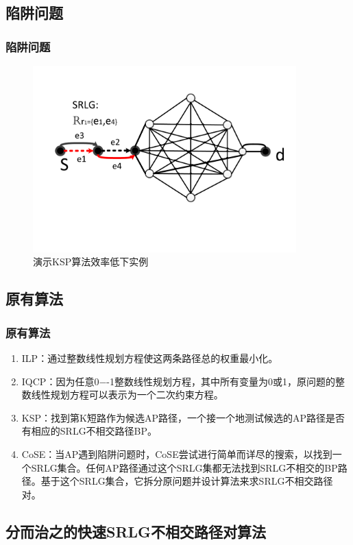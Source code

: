 \subsection{陷阱问题}
\begin{frame}
\frametitle{陷阱问题}
\begin{figure}[htbp]
\centering
\includegraphics[width=4.0in]{figures/KSPproblem}
  \caption{演示KSP算法效率低下实例}
  \label{fig:KSPproblem}
\end{figure}
\end{frame}


\subsection{原有算法}
\begin{frame}
\frametitle{原有算法}
  \begin{enumerate}
  \item ILP：通过整数线性规划方程使这两条路径总的权重最小化。
  \item IQCP：因为任意0−-1整数线性规划方程，其中所有变量为0或1，原问题的整数线性规划方程可以表示为一个二次约束方程。
  \item KSP：找到第K短路作为候选AP路径，一个接一个地测试候选的AP路径是否有相应的SRLG不相交路径BP。
  \item CoSE：当AP遇到陷阱问题时，CoSE尝试进行简单而详尽的搜索，以找到一个SRLG集合。任何AP路径通过这个SRLG集都无法找到SRLG不相交的BP路径。基于这个SRLG集合，它拆分原问题并设计算法来求SRLG不相交路径对。
\end{enumerate}
\end{frame}



\subsection{分而治之的快速SRLG不相交路径对算法}
